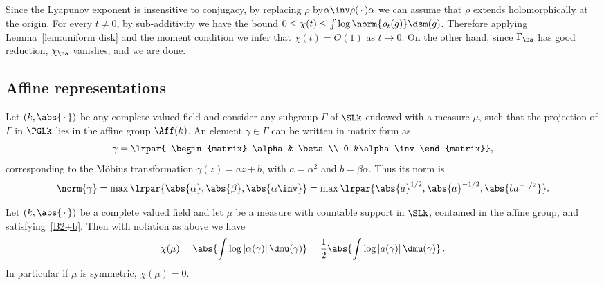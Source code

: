 Since the Lyapunov exponent is insensitive to conjugacy, by replacing $\rho$ by\linebreak $\alpha\inv\rho({\,\cdot\,})\alpha$ we can assume that $\rho$ extends holomorphically at the origin. For every $t\neq 0$, by sub-additivity we have the bound $0\leq \chi(t) \leq \int \log \norm{\rho_t(g)} \dsm(g)$. Therefore applying Lemma~\ref{lem:uniform disk} and the moment condition we infer that $\chi(t) = O(1)$ as $t\to 0$. On the other hand, since $\Gamma_\na$ has good reduction, $\chi_\na$ vanishes, and we are done.

\subsection{Affine representations}

Let $({k},\abs{{\,\cdot\,}})$ be any complete valued field and consider any subgroup $\Gamma$ of $\SLk$ endowed with a measure $\mu$, such that the projection of $\Gamma$ in $\PGLk$ lies in the affine group $\Aff(k)$. An element $\gamma\in \Gamma$ can be written in matrix form as
\begin{equation}\label{eq:matrix}
\gamma = \lrpar{
\begin{matrix} \alpha & \beta \\ 0 &\alpha\inv
\end{matrix}},
\end{equation}
corresponding to the M\"obius transformation $\gamma(z) = az+b$, with $a= \alpha^2$ and $b = \beta\alpha$. Thus its norm is
\begin{equation}\label{eq:norm affine}
\norm{\gamma} =
\max\lrpar{ \abs{\alpha}, \abs{\beta}, \abs{\alpha\inv} }= \max\lrpar{\abs{a}^{1/2}, \abs{a}^{ -1/2}, \abs{ba^{-1/2}} }.
\end{equation}

\begin{prop}\label{prop:formula affine}
Let $(k,\abs{{\,\cdot\,}})$ be a complete valued field and let $\mu$ be a measure with countable support in $\SLk$, contained in the affine group, and satisfying~\eqref{B2+b}. Then with notation as above we have
\begin{equation}\label{eq:formula affine}
\chi(\mu) =
\abs{\int \log |\alpha (\gamma)| \, \dmu(\gamma)} = \frac12 \abs{\int \log |a(\gamma)|\, \dmu(\gamma)}\,.
\end{equation}
In particular if $\mu$ is symmetric, $\chi(\mu) = 0$.
\end{prop}

